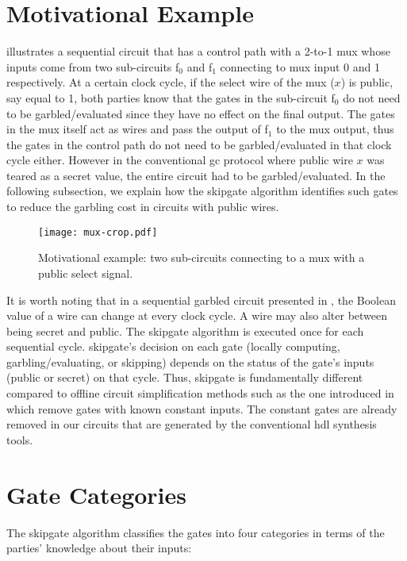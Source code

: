 \section{Motivational Example}\label{sec:skipgate-motiv}
 illustrates a sequential circuit that has a control path with a 2-to-1 \acrshort{mux} whose inputs come from two sub-circuits f$_0$ and f$_1$ connecting to \acrshort{mux} input 0 and 1 respectively.
At a certain clock cycle, if the select wire of the \acrshort{mux} ($x$) is public, say equal to 1, both parties know that the gates in the sub-circuit f$_0$ do not need to be garbled/evaluated since they have no effect on the final output.
The gates in the \acrshort{mux} itself act as wires and pass the output of f$_1$ to the \acrshort{mux} output, thus the gates in the control path do not need to be garbled/evaluated in that clock cycle either.
However in the conventional \acrshort{gc} protocol where public wire $x$ was teared as a secret value, the entire circuit had to be garbled/evaluated.
In the following subsection, we explain how the \gls{skipgate} algorithm identifies such gates to reduce the garbling cost in circuits with public wires.

\begin{figure}[h]
    \centering
    \texttt{[image: mux-crop.pdf]}
    \caption{Motivational example: two sub-circuits connecting to a \acrshort{mux} with a public select signal.}
\label{fig:mux}
\end{figure}

It is worth noting that in a sequential garbled circuit presented in , the Boolean value of a wire can change at every clock cycle.
A wire may also alter between being secret and public.
The \gls{skipgate} algorithm is executed once for each sequential cycle.
\gls{skipgate}'s decision on each gate (locally computing, garbling/evaluating, or skipping) depends on the status of the gate's inputs (public or secret) on that cycle.
Thus, \gls{skipgate} is fundamentally different compared to offline circuit simplification methods such as the one introduced in~\cite{pinkas2009secure} which remove gates with known constant inputs.
The constant gates are already removed in our circuits that are generated by the conventional \acrshort{hdl} synthesis tools.

\section{Gate Categories}\label{sec:skipgate-cat}
The \gls{skipgate} algorithm classifies the gates into four categories in terms of the parties' knowledge about their inputs:

